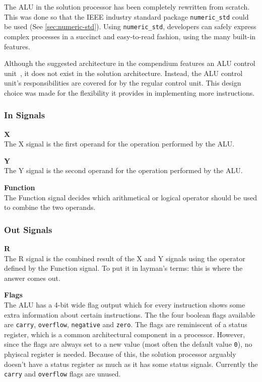 The ALU in the solution processor has been completely rewritten from scratch.
This was done so that the IEEE industry standard package \texttt{numeric\_std} could be used (See \vref{sec:numeric-std}).
Using \texttt{numeric\_std}, developers can safely express complex processes in a succinct and easy-to-read fashion, using the many built-in features.

Although the suggested architecture in the compendium features an ALU control unit~\cite[p.115]{compendium}, it does not exist in the solution architecture.
Instead, the ALU control unit's responsibilities are covered for by the regular control unit.
This design choice was made for the flexibility it provides in implementing more instructions.

\subsubsection{In Signals}

\begin{description}
\item{\textbf{X}} \\
The X signal is the first operand for the operation performed by the ALU.

\item{\textbf{Y}} \\
The Y signal is the second operand for the operation performed by the ALU.

\item{\textbf{Function}} \\
The Function signal decides which arithmetical or logical operator should be used to combine the two operands.
\end{description}

\subsubsection{Out Signals}

\begin{description}
\item{\textbf{R}} \\
The R signal is the combined result of the X and Y signals using the operator defined by the Function signal.
To put it in layman's terms: this is where the answer comes out.

\item{\textbf{Flags}} \\
The ALU has a 4-bit wide flag output which for every instruction shows some extra information about certain instructions.
The the four boolean flags available are \texttt{carry}, \texttt{overflow}, \texttt{negative} and \texttt{zero}.
The flags are reminiscent of a status register, which is a common architectural component in a processor.
However, since the flags are always set to a new value (most often the default value \texttt{0}), no phyiscal register is needed.
Because of this, the solution processor arguably doesn't have a status register as much as it has some status signals.
Currently the \texttt{carry} and \texttt{overflow} flags are unused.

\end{description}

